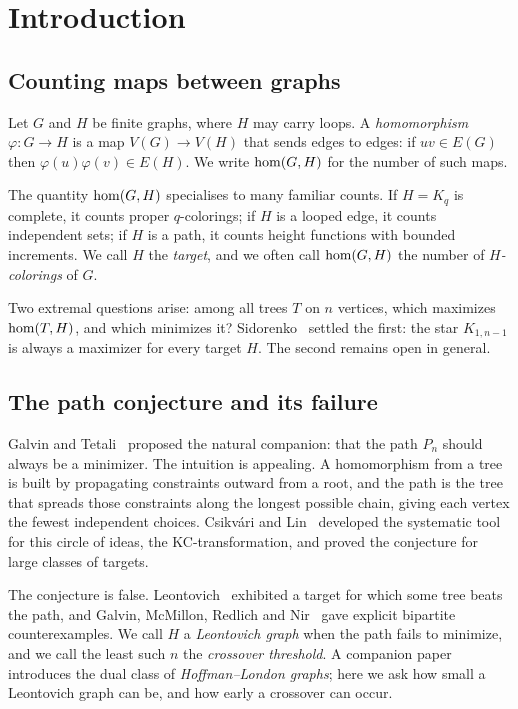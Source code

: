\section{Introduction}
\label{sec:intro}

\subsection{Counting maps between graphs}

Let $G$ and $H$ be finite graphs, where $H$ may carry loops. A
\emph{homomorphism} $\varphi \colon G \to H$ is a map
$V(G) \to V(H)$ that sends edges to edges: if $uv \in E(G)$ then
$\varphi(u)\varphi(v) \in E(H)$. We write $\mathrm{hom}(G,H)$ for the number of
such maps.

The quantity $\mathrm{hom}(G,H)$ specialises to many familiar counts. If
$H = K_q$ is complete, it counts proper $q$-colorings; if $H$ is a
looped edge, it counts independent sets; if $H$ is a path, it counts
height functions with bounded increments. We call $H$ the
\emph{target}, and we often call $\mathrm{hom}(G,H)$ the number of
\emph{$H$-colorings} of $G$.

Two extremal questions arise: among all trees $T$ on $n$ vertices,
which maximizes $\mathrm{hom}(T,H)$, and which minimizes it? Sidorenko~\cite{sidorenko1991}
settled the first: the star $K_{1,n-1}$ is always a maximizer for every
target $H$. The second remains open in general.

\subsection{The path conjecture and its failure}

Galvin and Tetali~\cite{galvin-tetali} proposed the natural companion:
that the path $P_n$ should always be a minimizer. The intuition is
appealing. A homomorphism from a tree is built by propagating
constraints outward from a root, and the path is the tree that spreads
those constraints along the longest possible chain, giving each vertex
the fewest independent choices. Csikv\'ari and Lin~\cite{csikvari-lin}
developed the systematic tool for this circle of ideas, the
KC-transformation, and proved the conjecture for large classes of
targets.

The conjecture is false. Leontovich~\cite{leontovich1989} exhibited a
target for which some tree beats the path, and
Galvin, McMillon, Redlich and Nir~\cite{galvin2025} gave explicit
bipartite counterexamples. We call $H$ a \emph{Leontovich graph} when
the path fails to minimize, and we call the least such $n$ the
\emph{crossover threshold}. A companion paper~\cite{galvin2026}
introduces the dual class of \emph{Hoffman--London graphs}; here we ask
how small a Leontovich graph can be, and how early a crossover can
occur.

